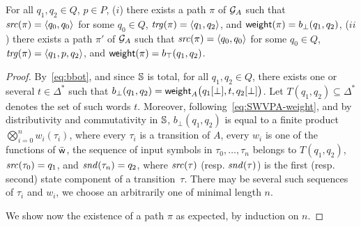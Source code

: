 \begin{lemma}[Completeness]
For all $q_1, q_2 \in Q$, $p\in P$, 
($i$) there exists a path $\pi$ of $\mathcal{G}_A$ 
such that $\src(\pi) = \<q_0, q_0>$ for some $q_0 \in Q$, 
$\trg(\pi) = \< q_1, q_2>$,
and $\mathsf{weight}(\pi) = b_\bot(q_1, q_2)$, 
($ii$) there exists a path $\pi'$ of $\mathcal{G}_A$ 
such that $\src(\pi) = \<q_0, q_0>$ for some $q_0 \in Q$, 
$\trg(\pi) = \< q_1, p, q_2>$,
and $\mathsf{weight}(\pi) = b_\top(q_1, q_2)$.
\end{lemma}
%
\begin{proof}
By~\eqref{eq:bbot}, 
and since $\mathbb{S}$ is total, for all $q_1, q_2 \in Q$, 
there exists one or several $t \in \Delta^*$ such that  
$b_\bot(q_1, q_2) = \mathsf{weight}_A\bigl(q_1[{\bot}], t, q_2[{\bot}]\bigr)$.
Let $T(q_1, q_2) \subseteq \Delta^*$ denotes the set of such words $t$. %
%
Moreover, following~\eqref{eq:SWVPA-weight}, and by distributivity and commutativity in $\mathbb{S}$, 
$b_\bot(q_1, q_2)$ is equal to a finite product $\bigotimes_{i=0}^n w_i(\tau_i)$, 
where every $\tau_i$ is a transition of $A$, every $w_i$ is one of the functions of $\bar{\mathsf{w}}$,
the sequence of input symbols in $\tau_0,\ldots, \tau_n$ belongs to $T(q_1, q_2)$, 
$\mathit{src}(\tau_0) = q_1$, and $\mathit{snd}(\tau_n) = q_2$, where 
$\mathit{src}(\tau)$ (resp. $\mathit{snd}(\tau)$) is the first (resp. second) state component of a transition~$\tau$.
There may be several such sequences of $\tau_i$ and $w_i$, we choose an arbitrarily one of minimal length $n$.


We show now the existence of a path $\pi$ as expected, by induction on $n$.
\end{proof}




